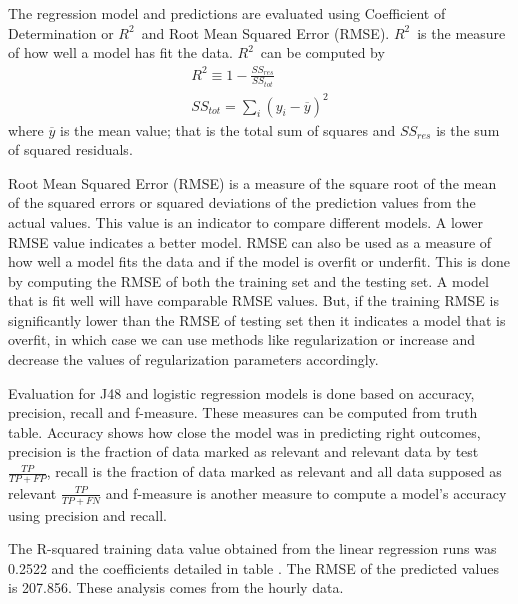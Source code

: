 \documentclass[12pt]{article}
\newcommand{\rtt}{${\mathit R}^2$}
\begin{document}

The regression model and predictions are evaluated using Coefficient of
Determination or \rtt\ and Root Mean Squared Error (RMSE).  \rtt\ is the
measure of how well a model has fit the data. \rtt\ can be computed by
\begin{equation}
\begin{gathered}
R^2 \equiv 1 - \frac{SS_{res}}{SS_{tot}}\\
SS_{tot} = \sum_i(y_i - \overline{y})^2
\end{gathered}
\end{equation}
where $\overline{y}$ is the mean value; that is the total sum of squares and
$SS_{res}$ is the sum of squared residuals.

Root Mean Squared Error (RMSE) is a measure of the square root of the mean of
the squared errors or squared deviations of the prediction values from the
actual values. This value is an indicator to compare different models. A lower
RMSE value indicates a better model.  RMSE can also be used as a measure of how
well a model fits the data and if the model is overfit or underfit. This is
done by computing the RMSE of both the training set and the testing set. A
model that is fit well will have comparable RMSE values. But, if the training
RMSE is significantly lower than the RMSE of testing set then it indicates a
model that is overfit, in which case we can use methods like regularization or
increase and decrease the values of regularization parameters accordingly.


            
Evaluation for J48 and logistic regression models is done based on accuracy,
precision, recall and f-measure. These measures can be computed from truth
table. Accuracy shows how close the model was in predicting right outcomes,
precision is the fraction of data marked as relevant and relevant data by test
$\frac{TP}{TP + FP}$, recall is the fraction of data marked as relevant and all
data supposed as relevant $\frac{TP}{TP + FN}$ and f-measure is another measure
to compute a model’s accuracy using precision and recall.






The R-squared training data value obtained from the linear regression runs was
0.2522 and the coefficients detailed in table .  The RMSE
of the predicted values is 207.856.  These analysis comes from the hourly data.
\end{document}
